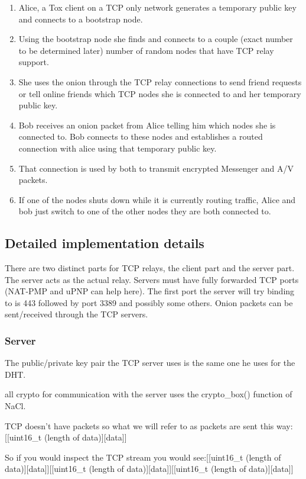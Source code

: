 \documentclass{tox}
\begin{document}
\begin{enumerate}
\item Alice, a Tox client on a TCP only network generates a temporary public key and connects to a bootstrap node.
\item Using the bootstrap node she finds and connects to a couple (exact number to be determined later) number of random nodes that have TCP relay support.
\item She uses the onion through the TCP relay connections to send friend requests or tell online friends which TCP nodes she is connected to and her temporary public key.
\item Bob receives an onion packet from Alice telling him which nodes she is connected to. Bob connects to these nodes and establishes a routed connection with alice using that temporary public key.
\item That connection is used by both to transmit encrypted Messenger and A/V packets.
\item If one of the nodes shuts down while it is currently routing traffic, Alice and bob just switch to one of the other nodes they are both connected to.
\end{enumerate}

\subsection{Detailed implementation details}

There are two distinct parts for TCP relays, the client part and the server part.
The server acts as the actual relay. Servers must have fully forwarded TCP ports (NAT-PMP and uPNP can help here). The first port the server will try binding to is 443 followed by port 3389 and possibly some others. Onion packets can be sent/received through the TCP servers.

\subsubsection{Server}

The public/private key pair the TCP server uses is the same one he uses for the DHT. 

all crypto for communication with the server uses the crypto\_box() function of NaCl.

TCP doesn't have packets so what we will refer to as packets are sent this way: [[uint16\_t (length of data)][data]]

So if you would inspect the TCP stream you would see:[[uint16\_t (length of data)][data]][[uint16\_t (length of data)][data]][[uint16\_t (length of data)][data]]
\end{document}
